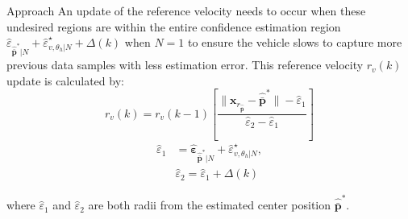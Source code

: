 \begin{section}{Approach}
An update of the reference velocity needs to occur when these undesired regions are within the entire confidence estimation region $ \hat{\varepsilon}_{\hat{\bar{\bm{p}}}^*|N} +\hat{\varepsilon}_{v,\theta_h|N}^{\star}+\Delta(k)$ when $N=1$ to ensure the vehicle slows to capture more previous data samples with less estimation error. This reference velocity $r_v(k)$ update is calculated by:
    \begin{equation}
	    r_v(k)=r_v(k-1) \left[ \frac{\lVert \bm{x}_{r_{\hat{\bar{\bm{p}}}}} - \hat{\bar{\bm{p}}}^* \rVert - \hat{\varepsilon}_1}{\hat{\varepsilon}_2 - \hat{\varepsilon}_1} \right]
	\end{equation}
	\begin{equation}
	\begin{split}
	    \hat{\varepsilon}_1&=\hat{\bm{\varepsilon}}_{\hat{\bar{\bm{p}}}^*|N} +\hat{\varepsilon}_{v,\theta_h|N}^{\star},\\ &\hat{\varepsilon}_2=\hat{\varepsilon}_1+\Delta(k) \nonumber	    
	\end{split}
	\end{equation}
	
where $\hat{\varepsilon}_1$ and $\hat{\varepsilon}_2$ are both radii from the estimated center position $\hat{\bar{\bm{p}}}^*$.
	



\end{section}
